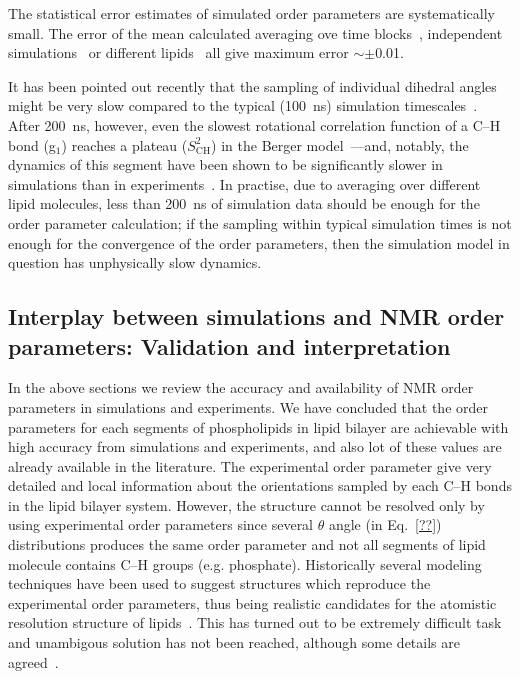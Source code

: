 \documentclass[aps,prl,superscriptaddress,twocolumn]{revtex4}
\begin{document}
The statistical error estimates of simulated order parameters are systematically
small. The error of the mean calculated averaging ove time blocks~\cite{ollila07}, independent 
simulations~\cite{poger12} or different lipids~\cite{botain15} all give maximum error $\sim \pm$0.01.

It has been pointed out recently that the sampling of individual dihedral angles might be very
slow compared to the typical (100~ns) simulation timescales~\cite{vogel12}.
After 200~ns, however, even the slowest rotational correlation function of a C--H bond  (g$_1$) reaches
a plateau ($S_\mathrm{CH}^2$) in the Berger model~\cite{berger97}---and, notably,
the dynamics of this segment have been shown to be significantly slower in simulations
than in experiments~\cite{ferreira15}.
In practise,
due to averaging over different lipid molecules,
less than 200~ns of simulation data should be enough for the order parameter calculation;
if the sampling within typical simulation times
is not enough for the convergence of the order parameters,
then the simulation model in question has unphysically slow dynamics.



\subsection{Interplay between simulations and NMR order parameters: Validation and interpretation}

In the above sections we review the accuracy and availability of NMR order parameters in simulations and experiments.
We have concluded that the order parameters for each segments of phospholipids in lipid bilayer are achievable
with high accuracy from simulations and experiments, and also lot of these values are already available 
in the literature. The experimental order parameter give very detailed and local information about the orientations
sampled by each C--H bonds in the lipid bilayer system. However, the structure cannot be resolved only by using 
experimental order parameters since several $\theta$ angle (in Eq.~\ref{??}) distributions produces the same
order parameter and not all segments of lipid molecule contains C--H groups (e.g. phosphate). 
Historically several modeling techniques have been used to suggest structures which reproduce the 
experimental order parameters, thus being realistic candidates for the atomistic resolution structure
of lipids~\cite{??}. This has turned out to be extremely difficult task and unambigous solution has not
been reached, although some details are agreed~\cite{??}.
\end{document}
